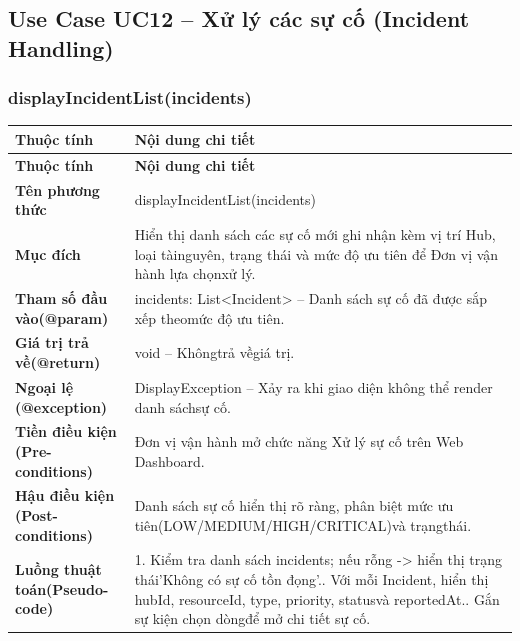 \subsection{Use Case UC12 – Xử lý các sự cố (Incident Handling)}
\subsubsection{displayIncidentList(incidents)}
\begin{longtable}{|L{0.24\textwidth}|L{0.70\textwidth}|}
\hline
\textbf{Thuộc tính} & \textbf{Nội dung chi tiết} \\
\hline
\endfirsthead
\hline
\textbf{Thuộc tính} & \textbf{Nội dung chi tiết} \\
\hline
\endhead
\textbf{Tên phương thức} & displayIncidentList(incidents) \\
\hline
\textbf{Mục đích} & Hiển thị danh sách các sự cố mới ghi nhận kèm vị trí Hub, loại tài\newline nguyên, trạng thái và mức độ ưu tiên để Đơn vị vận hành lựa chọn\newline xử lý. \\
\hline
\textbf{Tham số đầu vào}\newline \textbf{(@param)} & incidents: List<Incident> – Danh sách sự cố đã được sắp xếp theo\newline mức độ ưu tiên. \\
\hline
\textbf{Giá trị trả về(@return)} & void – Khôngtrả vềgiá trị. \\
\hline
\textbf{Ngoại lệ (@exception)} & DisplayException – Xảy ra khi giao diện không thể render danh sách\newline sự cố. \\
\hline
\textbf{Tiền điều kiện (Pre-}\newline \textbf{conditions)} & Đơn vị vận hành mở chức năng Xử lý sự cố trên Web Dashboard. \\
\hline
\textbf{Hậu điều kiện (Post-}\newline \textbf{conditions)} & Danh sách sự cố hiển thị rõ ràng, phân biệt mức ưu tiên\newline (LOW/MEDIUM/HIGH/CRITICAL)và trạngthái. \\
\hline
\textbf{Luồng thuật toán}\newline \textbf{(Pseudo-code)} & 1. Kiểm tra danh sách incidents; nếu rỗng -> hiển thị trạng thái\newline 'Không có sự cố tồn đọng'.. Với mỗi Incident, hiển thị hubId, resourceId, type, priority, status\newline và reportedAt.. Gắn sự kiện chọn dòngđể mở chi tiết sự cố. \\
\hline
\end{longtable}
\vspace{-0.5\baselineskip}
